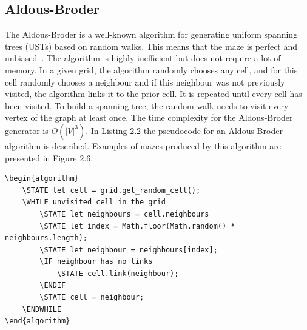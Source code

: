 \subsection{Aldous-Broder}
The Aldous-Broder is a well-known algorithm for generating uniform spanning trees (USTs) based on random walks. This means that the maze is perfect and
unbiased~\cite{17}. The algorithm is highly inefficient but does not require a lot of memory. In a given grid, the algorithm randomly chooses any cell,
and for this cell randomly chooses a neighbour and if this neighbour was not previously visited, the algorithm links it to the prior cell. It is repeated
until every cell has been visited. To build a spanning tree, the random walk needs to visit every vertex of the graph at least once. The time complexity
for the Aldous-Broder generator is $O(|V|^3)$. In Listing 2.2 the pseudocode for an Aldous-Broder algorithm is described. Examples of mazes produced by
this algorithm are presented in Figure 2.6.
\newline
\begin{lstlisting}[caption={Pseudocode for an Aldous-Broder algorithm. Developped by the author, based on~\cite{17}.}]
\begin{algorithm}
	\STATE let cell = grid.get_random_cell();
	\WHILE unvisited cell in the grid
		\STATE let neighbours = cell.neighbours
		\STATE let index = Math.floor(Math.random() * neighbours.length);
		\STATE let neighbour = neighbours[index];
		\IF neighbour has no links
			\STATE cell.link(neighbour);
		\ENDIF
		\STATE cell = neighbour;
	\ENDWHILE
\end{algorithm}
\end{lstlisting}

